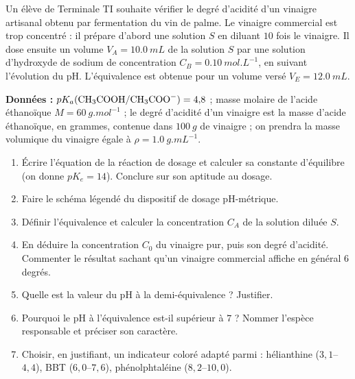 \documentclass[11pt]{article}
\begin{document}
\begin{exercice}
Un élève de Terminale TI souhaite vérifier le degré d'acidité d'un vinaigre artisanal obtenu par fermentation du vin de palme. Le vinaigre commercial est trop concentré : il prépare d'abord une solution $S$ en diluant $10$ fois le vinaigre. Il dose ensuite un volume $V_A = \SI{10,0}{mL}$ de la solution $S$ par une solution d'hydroxyde de sodium de concentration $C_B = \SI{0,10}{mol.L^{-1}}$, en suivant l'évolution du pH. L'équivalence est obtenue pour un volume versé $V_E = \SI{12,0}{mL}$.

\textbf{Données :} $pK_a(\ce{CH3COOH}/\ce{CH3COO-}) = 4{,}8$ ; masse molaire de l'acide éthanoïque $M = \SI{60}{g.mol^{-1}}$ ; le degré d'acidité d'un vinaigre est la masse d'acide éthanoïque, en grammes, contenue dans $\SI{100}{g}$ de vinaigre ; on prendra la masse volumique du vinaigre égale à $\rho = \SI{1,0}{g.mL^{-1}}$.
\begin{enumerate}
\item Écrire l'équation de la réaction de dosage et calculer sa constante d'équilibre (on donne $pK_e = 14$). Conclure sur son aptitude au dosage.
\item Faire le schéma légendé du dispositif de dosage pH-métrique.
\item Définir l'équivalence et calculer la concentration $C_A$ de la solution diluée $S$.
\item En déduire la concentration $C_0$ du vinaigre pur, puis son degré d'acidité. Commenter le résultat sachant qu'un vinaigre commercial affiche en général $6$ degrés.
\item Quelle est la valeur du pH à la demi-équivalence ? Justifier.
\item Pourquoi le pH à l'équivalence est-il supérieur à $7$ ? Nommer l'espèce responsable et préciser son caractère.
\item Choisir, en justifiant, un indicateur coloré adapté parmi : hélianthine ($3{,}1$--$4{,}4$), BBT ($6{,}0$--$7{,}6$), phénolphtaléine ($8{,}2$--$10{,}0$).
\end{enumerate}
\end{exercice}
\end{document}
